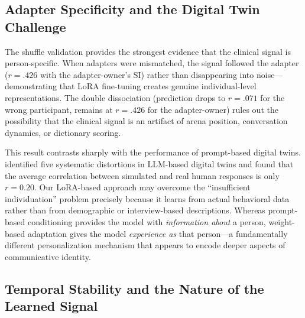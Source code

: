 \documentclass[review,12pt,authoryear]{elsarticle}
\begin{document}
\subsection{Adapter Specificity and the Digital Twin Challenge}

The shuffle validation provides the strongest evidence that the clinical signal is person-specific. When adapters were mismatched, the signal followed the adapter ($r = .426$ with the adapter-owner's SI) rather than disappearing into noise---demonstrating that LoRA fine-tuning creates genuine individual-level representations. The double dissociation (prediction drops to $r = .071$ for the wrong participant, remains at $r = .426$ for the adapter-owner) rules out the possibility that the clinical signal is an artifact of arena position, conversation dynamics, or dictionary scoring.

This result contrasts sharply with the performance of prompt-based digital twins. \citet{peng2025funhouse} identified five systematic distortions in LLM-based digital twins and found that the average correlation between simulated and real human responses is only $r = 0.20$. Our LoRA-based approach may overcome the ``insufficient individuation'' problem precisely because it learns from actual behavioral data rather than from demographic or interview-based descriptions. Whereas prompt-based conditioning provides the model with \textit{information about} a person, weight-based adaptation gives the model \textit{experience as} that person---a fundamentally different personalization mechanism that appears to encode deeper aspects of communicative identity.

\subsection{Temporal Stability and the Nature of the Learned Signal}

\end{document}
